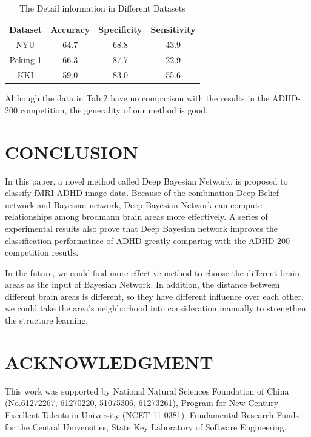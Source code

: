 \documentclass[10pt,twocolumn,letterpaper]{article}
\begin{document}
\begin{table}[h]
\label{tab:2}
\caption{The Detail information in Different Datasets}
\begin{center}
\begin{tabular}{cccc}
\hline

Dataset  	&   Accuracy  	&	Specificity  &	Sensitivity \\
\hline
NYU			&  64.7	&  68.8 & 43.9 \\[2pt]
Peking-1		& 66.3 & 87.7 &22.9\\[2pt]
KKI			& 59.0  & 83.0  & 55.6\\[2pt]
\hline
\end{tabular}
\end{center}
\end{table}


Although the data in Tab 2 have no comparison with the results in the ADHD-200 competition, the generality of our method is good.




\section{CONCLUSION}
In this paper, a novel method called Deep Bayesian Network, is proposed to classify fMRI ADHD image data. Because of the combination Deep Belief network and Bayeisan network, Deep Bayesian Network can compute relationships among brodmann brain areas more effectively. A series of experimental results also prove that Deep Bayesian network  improves the classification performatnce of ADHD greatly comparing with the ADHD-200 competition resutls. 


In the future, we could find more effective method to choose the different brain areas as the input of Bayesian Network. In addition, the distance between different brain areas is different, so they have different influence over each other. we could take  the area's neighborhood into consideration manually to strengthen the structure learning.



\section{ACKNOWLEDGMENT}

This work was supported by National Natural Sciences
Foundation of China (No.61272267, 61270220, 51075306,
61273261), Program for New Century Excellent Talents in
University (NCET-11-0381), Fundamental Research Funds for
the Central Universities, State Key Laboratory of Software
Engineering.

{\small


}
\end{document}

